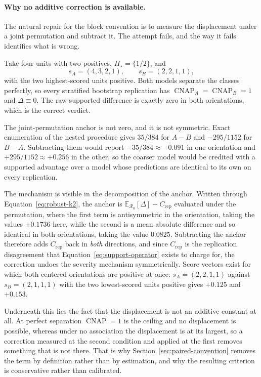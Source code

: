 \documentclass[11pt]{article}
\newcommand{\CNAP}{\operatorname{CNAP}}
\newcommand{\Regime}{\mathcal{R}}
\newcommand{\PSet}{\Pi_\star}
\newcommand{\E}{\mathbb{E}}
\theoremstyle{remark}
\begin{document}
\paragraph{Why no additive correction is available.}
The natural repair for the block convention is to measure the displacement under a joint permutation and subtract it. The attempt fails, and the way it fails identifies what is wrong.

Take four units with two positives, $\PSet=\{1/2\}$, and
\[
s_A=(4,3,2,1),
\qquad
s_B=(2,2,1,1),
\]
with the two highest-scored units positive. Both models separate the classes perfectly, so every stratified bootstrap replication has $\CNAP_A=\CNAP_B=1$ and $\Delta\equiv0$. The raw supported difference is exactly zero in both orientations, which is the correct verdict.

The joint-permutation anchor is not zero, and it is not symmetric. Exact enumeration of the nested procedure gives $35/384$ for $A-B$ and $-295/1152$ for $B-A$. Subtracting them would report $-35/384\approx-0.091$ in one orientation and $+295/1152\approx+0.256$ in the other, so the coarser model would be credited with a supported advantage over a model whose predictions are identical to its own on every replication.

The mechanism is visible in the decomposition of the anchor. Written through Equation~\eqref{eq:robust-k2}, the anchor is $\E_{\Regime_0}[\Delta]-C_{\mathrm{rep}}$ evaluated under the permutation, where the first term is antisymmetric in the orientation, taking the values $\pm0.1736$ here, while the second is a mean absolute difference and so identical in both orientations, taking the value $0.0825$. Subtracting the anchor therefore adds $C_{\mathrm{rep}}$ back in \emph{both} directions, and since $C_{\mathrm{rep}}$ is the replication disagreement that Equation~\eqref{eq:support-operator} exists to charge for, the correction undoes the severity mechanism symmetrically. Score vectors exist for which both centered orientations are positive at once: $s_A=(2,2,1,1)$ against $s_B=(2,1,1,1)$ with the two lowest-scored units positive gives $+0.125$ and $+0.153$.

Underneath this lies the fact that the displacement is not an additive constant at all. At perfect separation $\CNAP=1$ is the ceiling and no displacement is possible, whereas under no association the displacement is at its largest, so a correction measured at the second condition and applied at the first removes something that is not there. That is why Section~\ref{sec:paired-convention} removes the term by definition rather than by estimation, and why the resulting criterion is conservative rather than calibrated.
\end{document}
